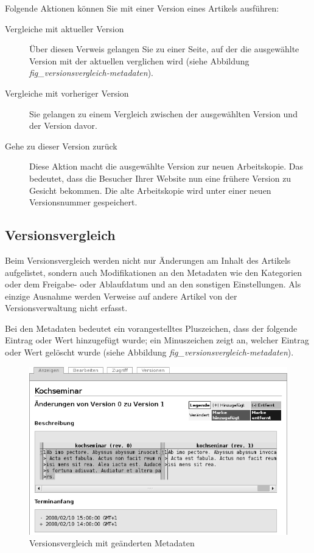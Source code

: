 \documentclass[a4paper,12pt,ngerman]{manual}
\begin{document}
Folgende Aktionen können Sie mit einer Version eines Artikels ausführen:
\begin{description}
\item[Vergleiche mit aktueller Version] \leavevmode
Über diesen Verweis gelangen Sie zu
einer Seite, auf der die ausgewählte Version mit der aktuellen verglichen
wird (siehe Abbildung \emph{fig\_versionsvergleich-metadaten}).

\item[Vergleiche mit vorheriger Version] \leavevmode
Sie gelangen zu einem Vergleich
zwischen der ausgewählten Version und der Version davor.

\item[Gehe zu dieser Version zurück] \leavevmode
Diese Aktion macht die ausgewählte
Version zur neuen Arbeitskopie. Das bedeutet, dass die Besucher Ihrer
Website nun eine frühere Version zu Gesicht bekommen. Die alte Arbeitskopie
wird unter einer neuen Versionsnummer gespeichert.

\end{description}


\subsection{Versionsvergleich}

Beim Versionsvergleich werden nicht nur Änderungen am Inhalt des
Artikels aufgelistet, sondern auch Modifikationen an den Metadaten wie
den Kategorien oder dem Freigabe- oder Ablaufdatum und an den
sonstigen Einstellungen. Als einzige Ausnahme werden Verweise auf
andere Artikel von der Versionsverwaltung nicht erfasst.

Bei den Metadaten bedeutet ein vorangestelltes Pluszeichen, dass der
folgende Eintrag oder Wert hinzugefügt wurde; ein Minuszeichen zeigt an,
welcher Eintrag oder Wert gelöscht wurde (siehe
Abbildung \emph{fig\_versionsvergleich-metadaten}).
\begin{figure}[htbp]
\centering

\includegraphics{versionsvergleich-metadaten.png}
\caption{Versionsvergleich mit geänderten Metadaten}\end{figure}
\end{document}
